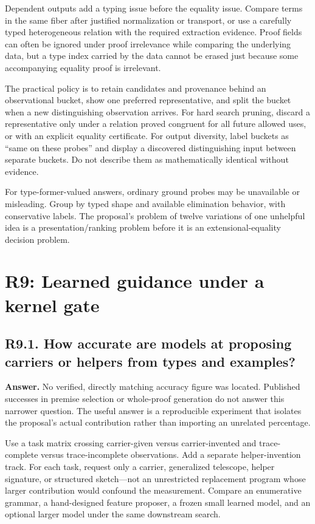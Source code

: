 \documentclass[11pt,a4paper]{article}
\newcommand{\question}[2]{\subsection{#1. #2}\label{q:#1}}
\theoremstyle{definition}
\theoremstyle{remark}
\begin{document}
Dependent outputs add a typing issue before the equality issue. Compare terms in the same fiber after justified normalization or transport, or use a carefully typed heterogeneous relation with the required extraction evidence. Proof fields can often be ignored under proof irrelevance while comparing the underlying data, but a type index carried by the data cannot be erased just because some accompanying equality proof is irrelevant.

The practical policy is to retain candidates and provenance behind an observational bucket, show one preferred representative, and split the bucket when a new distinguishing observation arrives. For hard search pruning, discard a representative only under a relation proved congruent for all future allowed uses, or with an explicit equality certificate. For output diversity, label buckets as ``same on these probes'' and display a discovered distinguishing input between separate buckets. Do not describe them as mathematically identical without evidence.

For type-former-valued answers, ordinary ground probes may be unavailable or misleading. Group by typed shape and available elimination behavior, with conservative labels. The proposal's problem of twelve variations of one unhelpful idea is a presentation/ranking problem before it is an extensional-equality decision problem.

\section{R9: Learned guidance under a kernel gate}\label{sec:r9}

\question{R9.1}{How accurate are models at proposing carriers or helpers from types and examples?}

\textbf{Answer.} No verified, directly matching accuracy figure was located. Published successes in premise selection or whole-proof generation do not answer this narrower question. The useful answer is a reproducible experiment that isolates the proposal's actual contribution rather than importing an unrelated percentage.

Use a task matrix crossing carrier-given versus carrier-invented and trace-complete versus trace-incomplete observations. Add a separate helper-invention track. For each task, request only a carrier, generalized telescope, helper signature, or structured sketch---not an unrestricted replacement program whose larger contribution would confound the measurement. Compare an enumerative grammar, a hand-designed feature proposer, a frozen small learned model, and an optional larger model under the same downstream search.
\end{document}

